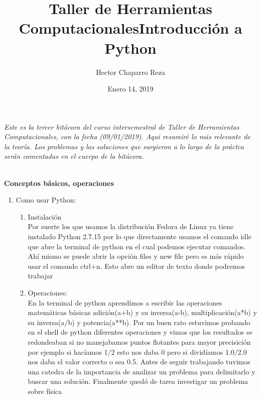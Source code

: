 \documentclass[letterpaper, 12pt, oneside]{article}
\title{\Huge{Taller de Herramientas Computacionales}}
\author{Hector Chaparro Reza}
\date{Enero 14, 2019}
\begin{document}
	\maketitle
	\it Este es la tercer bit\'acora del curso intersemestral de Taller de Herramientas Computacionales, con la fecha (09/01/2019). Aqui resumir\'e lo m\'as relevante de la teor\'ia. Los problemas y las soluciones que surgieron a lo largo de la pr\'actca ser\'an comentadas en el cuerpo de la bit\'acora. 
	\newpage
	
	\title{\Huge{Introducci\'on a Python}}\\
	
	\textbf{Conceptos b\'asicos, operaciones}\\
	
	\begin{enumerate}
		\item {Como usar Python:}
		\begin{enumerate}
			\item Instalaci\'on\\
			Por suerte los que usamos la distribuci\'on Fedora de Linux ya tiene instalado Python 2.7.15 por lo que directamente usamos el comando idle que abre la terminal de python en el cual podemos ejecutar comandos. Ah\'i mismo se puede abrir la opci\'on files y new file pero es m\'as r\'apido usar el comando ctrl+n. Esto abre un editor de texto donde podremos trabajar\\
			
			\item Operaciones:\\
			En la terminal de python aprend\'imos a escribir las operaciones matem\'aticas b\'asicas adici\'on(a+b) y su inversa(a-b), multiplicaci\'on(a*b) y su inversa(a/b) y potencia(a**b). Por un buen rato estuvimos probando en el shell de python diferentes operaciones y vimos que los resultados se redondeaban si no manejabamos puntos flotantes para mayor precisici\'on por ejemplo si hac\'iamos 1/2 esto nos daba 0 pero si divid\'iamos 1.0/2.0 nos daba el valor correcto o sea 0.5. Antes de seguir trabajando tuvimos una catedra de la importancia de analizar un problema para delimitarlo y buscar una soluci\'on. Finalmente qued\'o de tarea investigar un problema sobre f\'isica\\
			
		\end{enumerate}
	\end{enumerate}
\end{document}
